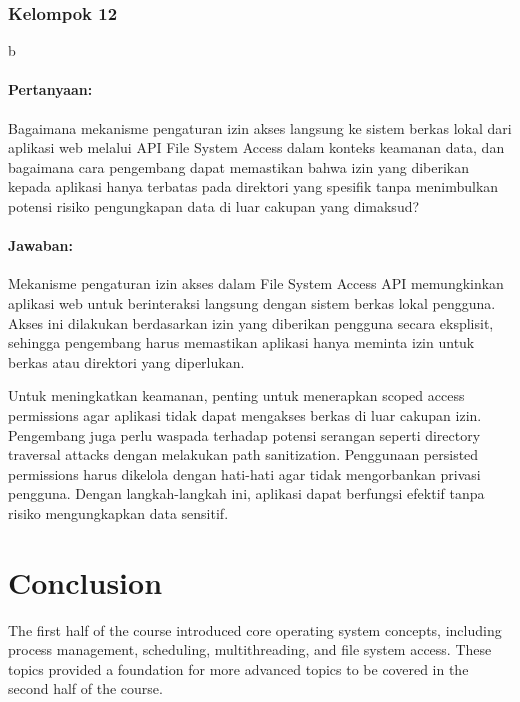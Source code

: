 \documentclass[12pt]{article}
\begin{document}
\subsubsection{Kelompok 12}b

\paragraph{Pertanyaan:} Bagaimana mekanisme pengaturan izin akses langsung ke sistem berkas lokal dari aplikasi web melalui API File System Access dalam konteks keamanan data, dan bagaimana cara pengembang dapat memastikan bahwa izin yang diberikan kepada aplikasi hanya terbatas pada direktori yang spesifik tanpa menimbulkan potensi risiko pengungkapan data di luar cakupan yang dimaksud?

\paragraph{Jawaban:} Mekanisme pengaturan izin akses dalam File System Access API memungkinkan aplikasi web untuk berinteraksi langsung dengan sistem berkas lokal pengguna. Akses ini dilakukan berdasarkan izin yang diberikan pengguna secara eksplisit, sehingga pengembang harus memastikan aplikasi hanya meminta izin untuk berkas atau direktori yang diperlukan.

Untuk meningkatkan keamanan, penting untuk menerapkan scoped access permissions agar aplikasi tidak dapat mengakses berkas di luar cakupan izin. Pengembang juga perlu waspada terhadap potensi serangan seperti directory traversal attacks dengan melakukan path sanitization. Penggunaan persisted permissions harus dikelola dengan hati-hati agar tidak mengorbankan privasi pengguna. Dengan langkah-langkah ini, aplikasi dapat berfungsi efektif tanpa risiko mengungkapkan data sensitif.



\section{Conclusion}
The first half of the course introduced core operating system concepts, including process management, scheduling, multithreading, and file system access. These topics provided a foundation for more advanced topics to be covered in the second half of the course.
\end{document}
